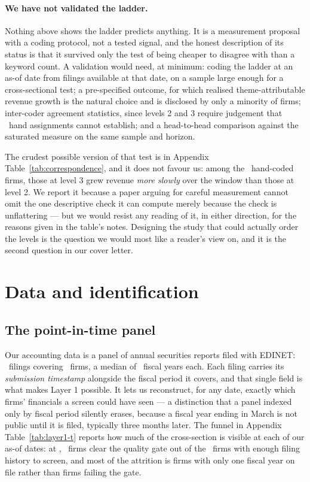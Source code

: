 \documentclass[a4paper,11pt]{article}
\begin{document}
\paragraph{We have not validated the ladder.}\label{sec:ladder-validation} Nothing above shows the
ladder predicts anything. It is a measurement proposal with a coding protocol, not a tested signal,
and the honest description of its status is that it survived only the test of being cheaper to
disagree with than a keyword count. A validation would need, at minimum: coding the ladder at an
as-of date from filings available at that date, on a sample large enough for a cross-sectional test;
a pre-specified outcome, for which realised theme-attributable revenue growth is the natural choice
and is disclosed by only a minority of firms; inter-coder agreement statistics, since levels 2 and 3
require judgement that \LadderVerified\ hand assignments cannot establish; and a head-to-head
comparison against the saturated measure on the same sample and horizon.

The crudest possible version of that test is in Appendix Table~\ref{tab:correspondence}, and it does
not favour us: among the \LadderVerified\ hand-coded firms, those at level 3 grew revenue
\emph{more slowly} over the window than those at level 2. We report it because a paper arguing for
careful measurement cannot omit the one descriptive check it can compute merely because the check is
unflattering --- but we would resist any reading of it, in either direction, for the reasons given in
the table's notes. Designing the study that could actually order the levels is the question we would
most like a reader's view on, and it is the second question in our cover letter.

\section{Data and identification}\label{sec:data}

\subsection{The point-in-time panel}

Our accounting data is a panel of annual securities reports filed with EDINET: \PanelFilings\ filings
covering \PanelFirms\ firms, a median of \PanelYears\ fiscal years each. Each filing carries its \emph{submission timestamp}
alongside the fiscal period it covers, and that single field is what makes Layer 1 possible. It lets
us reconstruct, for any date, exactly which firms' financials a screen could have seen --- a
distinction that a panel indexed only by fiscal period silently erases, because a fiscal year ending
in March is not public until it is filed, typically three months later. The funnel in Appendix
Table~\ref{tab:layer1-t} reports how much of the cross-section is visible at each of our as-of dates:
at \LoneADate, \LoneAGate\ firms clear the quality gate out of the \LoneAScreenable\ firms with enough filing
history to screen, and most of the attrition is firms with only one fiscal year on file rather than
firms failing the gate.
\end{document}
